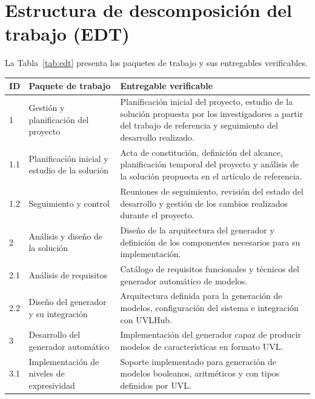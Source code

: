 \section{Estructura de descomposición del trabajo (EDT)}
\label{sec:edt}


La Tabla~\ref{tab:edt} presenta los paquetes de trabajo y sus
entregables verificables.

\begin{longtable}{@{}P{1cm} P{4.5cm} P{8.8cm}@{}}
  \toprule
  \textbf{ID} & \textbf{Paquete de trabajo} & \textbf{Entregable verificable} \\
  \midrule
  \endhead

  1 & Gestión y planificación del proyecto &
  Planificación inicial del proyecto, estudio de la solución propuesta por los investigadores
  a partir del trabajo de referencia y seguimiento del desarrollo realizado. \\[0.3em]

  1.1 & Planificación inicial y estudio de la solución &
  Acta de constitución, definición del alcance, planificación temporal del proyecto y
  análisis de la solución propuesta en el artículo de referencia. \\[0.3em]

  1.2 & Seguimiento y control &
  Reuniones de seguimiento, revisión del estado del desarrollo y gestión de los cambios
  realizados durante el proyecto. \\[0.3em]

  2 & Análisis y diseño de la solución &
  Diseño de la arquitectura del generador y definición de los componentes necesarios para su implementación. \\[0.3em]

  2.1 & Análisis de requisitos &
  Catálogo de requisitos funcionales y técnicos del generador automático de modelos. \\[0.3em]

  2.2 & Diseño del generador y su integración &
  Arquitectura definida para la generación de modelos, configuración del sistema e integración con UVLHub. \\[0.3em]

  3 & Desarrollo del generador automático &
  Implementación del generador capaz de producir modelos de características en formato UVL. \\[0.3em]

  3.1 & Implementación de niveles de expresividad &
  Soporte implementado para generación de modelos booleanos, aritméticos y con tipos definidos por UVL. \\[0.3em]


\end{longtable}
